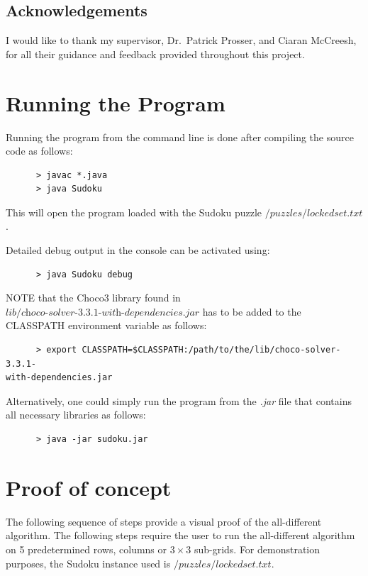 \documentclass{l4proj}
\begin{document}
\section{Acknowledgements}
\noindent I would like to thank my supervisor, Dr.~Patrick Prosser, and Ciaran McCreesh, for all their guidance and feedback provided throughout this project.

\begin{appendices}
\chapter{Running the Program}
Running the program from the command line is done after compiling the source code as follows:
\begin{verbatim}
      > javac *.java
      > java Sudoku
\end{verbatim}
This will open the program loaded with the Sudoku puzzle $\textit{/puzzles/lockedset.txt}$.

\noindent Detailed debug output in the console can be activated using:
\begin{verbatim}
      > java Sudoku debug
\end{verbatim}

\noindent NOTE that the Choco3 library \cite{choco} found in $\textit{lib/choco-solver-3.3.1-with-dependencies.jar}$ has to be added to the CLASSPATH environment variable as follows:

\begin{verbatim}
      > export CLASSPATH=$CLASSPATH:/path/to/the/lib/choco-solver-3.3.1-
with-dependencies.jar
\end{verbatim}

\noindent Alternatively, one could simply run the program from the \textit{.jar} file that contains all necessary libraries as follows:
\begin{verbatim}
      > java -jar sudoku.jar
\end{verbatim}


\chapter{Proof of concept}
\label{chapterpoc} 
The following sequence of steps provide a visual proof of the all-different algorithm. The following steps require the user to run the all-different algorithm on 5 predetermined rows, columns or $3\times 3$ sub-grids. For demonstration purposes, the Sudoku instance used is $/puzzles/lockedset.txt$.


\end{appendices}
\end{document}
